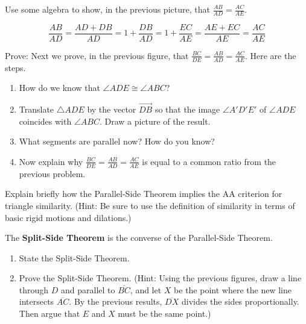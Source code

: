 \documentclass[nooutcomes]{ximera}
\begin{document}
\begin{problem}
Use some algebra to show, in the previous picture, that $\frac{AB}{AD} = \frac{AC}{AE}$.
\vspace{1in}
\end{problem}

\begin{teachingnote}
\[
\frac{AB}{AD} = \frac{AD+DB}{AD} = 1 + \frac{DB}{AD} =  1 + \frac{EC}{AE} 
= \frac{AE + EC}{AE} = \frac{AC}{AE}
\]
\end{teachingnote}

\begin{problem}
Prove:  Next we prove, in the previous figure, that $ \frac{BC}{DE} = \frac{AB}{AD} = \frac{AC}{AE}$.  Here are the steps.  
\begin{enumerate}
\item How do we know that $\angle ADE \cong \angle ABC$?  
\item Translate $\triangle ADE$ by the vector $\overrightarrow{DB}$ so that the image $\angle A'D'E'$ of $\angle ADE$ coincides with $\angle ABC$.  Draw a picture of the result.  
\item What segments are parallel now?  How do you know?  
\item Now explain why $\frac{BC}{DE} = \frac{AB}{AD} = \frac{AC}{AE}$ is equal to a common ratio from the previous problem.  
\end{enumerate}
\vfill
\end{problem}

\newpage

\begin{problem}
Explain briefly how the Parallel-Side Theorem implies the AA criterion for triangle similarity.  (Hint: Be sure to use the definition of similarity in terms of basic rigid motions and dilations.)  
\vfill
\end{problem}

\begin{problem}
The \textbf{Split-Side Theorem} is the converse of the Parallel-Side Theorem.   
\begin{enumerate}
\item State the Split-Side Theorem.   
\item Prove the Split-Side Theorem.  (Hint:  Using the previous figures, draw a line through $D$ and parallel to $\overline{BC}$, and let $X$ be the point where the new line intersects $\overline{AC}$.  By the previous results, $\overline{DX}$ divides the sides proportionally.  Then argue that $E$ and $X$ must be the same point.)  
\end{enumerate}
\vfill
\end{problem}
\end{document}
